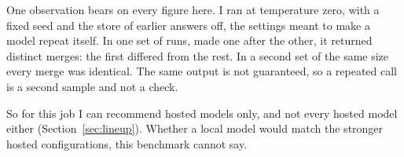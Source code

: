 One observation bears on every figure here. I ran  at temperature zero, with a fixed seed and the store of earlier answers off, the settings meant to make a model repeat itself. In one set of  runs, made one after the other, it returned  distinct merges: the first differed from the rest. In a second set of the same size every merge was identical. The same output is not guaranteed, so a repeated call is a second sample and not a check.

So for this job I can recommend hosted models only, and not every hosted model either (Section~\ref{sec:lineup}). Whether a local model would match the stronger hosted configurations, this benchmark cannot say.
